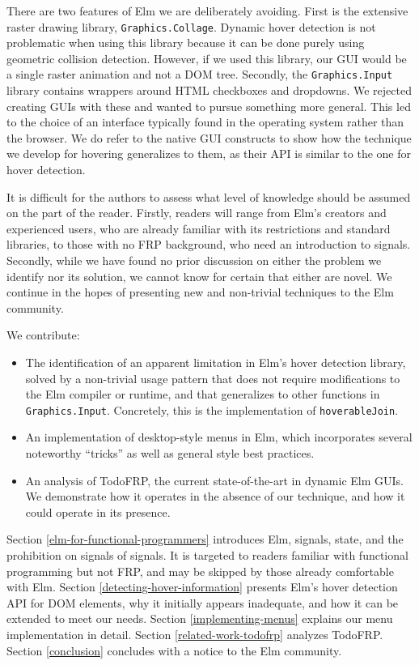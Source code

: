 \documentclass{article}
\begin{document}
There are two features of Elm we are deliberately avoiding. First is the
extensive raster drawing library, \texttt{Graphics.Collage}. Dynamic hover
detection is not problematic when using this library because it can be done
purely using geometric collision detection. However, if we used this library, our
GUI would be a single raster animation and not a DOM tree. Secondly, the
\texttt{Graphics.Input} library contains wrappers around HTML checkboxes and
dropdowns. We rejected creating GUIs with these and wanted to pursue something
more general. This led to the choice of an interface typically found in the
operating system rather than the browser. We do refer to the native GUI
constructs to show how the technique we develop for hovering generalizes to
them, as their API is similar to the one for hover detection.

It is difficult for the authors to assess what level of knowledge should
be assumed on the part of the reader. Firstly, readers will range from
Elm's creators and experienced users, who are already familiar with its
restrictions and standard libraries, to those with no FRP background,
who need an introduction to signals. Secondly, while we have found no
prior discussion on either the problem we identify nor its solution, we
cannot know for certain that either are novel. We continue in the hopes
of presenting new and non-trivial techniques to the Elm community.

We contribute:

\begin{itemize}
\itemsep1pt\parskip0pt
\item
  The identification of an apparent limitation in Elm's hover detection
  library, solved by a non-trivial usage pattern that does not require
  modifications to the Elm compiler or runtime, and that generalizes to
  other functions in \texttt{Graphics.Input}. Concretely, this is the
  implementation of \texttt{hoverableJoin}.
\item
  An implementation of desktop-style menus in Elm, which incorporates
  several noteworthy ``tricks'' as well as general style best practices.
\item
  An analysis of TodoFRP, the current state-of-the-art in dynamic Elm
  GUIs. We demonstrate how it operates in the absence of our technique,
  and how it could operate in its presence.
\end{itemize}

Section \ref{elm-for-functional-programmers} introduces Elm, signals, state, and
the prohibition on signals of signals. It is targeted to readers familiar with
functional programming but not FRP, and may be skipped by those already
comfortable with Elm. Section \ref{detecting-hover-information} presents Elm's
hover detection API for DOM elements, why it initially appears inadequate, and
how it can be extended to meet our needs. Section \ref{implementing-menus}
explains our menu implementation in detail. Section \ref{related-work-todofrp}
analyzes TodoFRP. Section \ref{conclusion} concludes with a notice to the Elm
community.
\end{document}
